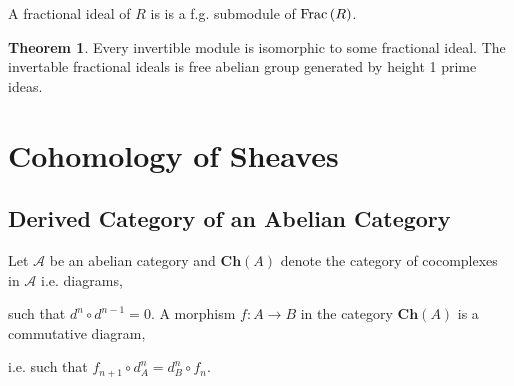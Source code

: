 \documentclass[12pt]{extarticle}
\theoremstyle{definition}
\newtheorem{theorem}{Theorem}[section]
\newenvironment{definition}[1][Definition:]{\begin{trivlist}
\item[\hskip \labelsep {\bfseries #1}]}{\end{trivlist}}
\begin{document}
\begin{definition}
A fractional ideal of $R$ is is a f.g. submodule of $\mathrm{Frac} \left( R \right)$. 
\end{definition}

\begin{theorem}
Every invertible module is isomorphic to some fractional ideal. The invertable fractional ideals is free abelian group generated by height 1 prime ideas.  
\end{theorem}

\section{Cohomology of Sheaves}

\subsection{Derived Category of an Abelian Category}

\newcommand{\A}{\mathcal{A}}
\newcommand{\Ch}[1]{\mathbf{Ch}\left( #1 \right)}
\newcommand{\Chb}[1]{\mathbf{Ch}^b\left( #1 \right)}
\newcommand{\Chplus}[1]{\mathbf{Ch}^+\left( #1 \right)}
\newcommand{\Khom}[1]{\mathbf{K}\left( #1 \right)}
\newcommand{\D}[1]{\mathfrak{D}\left( #1 \right)}

\begin{definition}
Let $\A$ be an abelian category and $\Ch{A}$ denote the category of cocomplexes in $\A$ i.e. diagrams,
\begin{center}
\end{center}
such that $d^n \circ d^{n-1} = 0$. A morphism $f : A \to B$ in the category $\Ch{A}$ is a commutative diagram,
\begin{center}
\end{center}
i.e. such that $f_{n+1} \circ d_A^{n} = d_B^n \circ f_n$. 
\end{definition}
\end{document}
